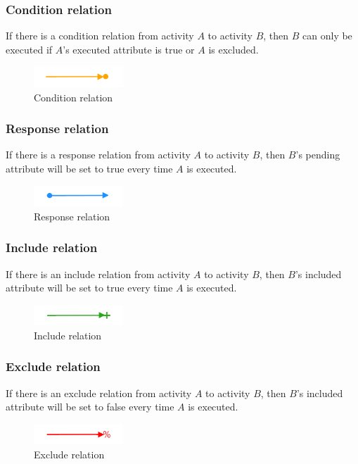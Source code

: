 \documentclass{article}
\begin{document}
			\subsubsection{Condition relation}
			If there is a condition relation from activity $A$ to activity $B$, then $B$ can only be executed if $A$'s executed attribute is true or $A$ is excluded.
			\begin{figure}[!ht]
				\centering
				\includegraphics[width=0.3\textwidth]{figures/ConditionRelation.png}
			 	\caption[Condition relation]
			 	{Condition relation}
			\end{figure}

			\subsubsection{Response relation}
			If there is a response relation from activity $A$ to activity $B$, then $B$'s pending attribute will be set to true every time $A$ is executed.
			\begin{figure}[!ht]
				\centering
				\includegraphics[width=0.3\textwidth]{figures/ResponseRelation.png}
			 	\caption[Response relation]
			 	{Response relation}
			\end{figure}

			\subsubsection{Include relation}
			If there is an include relation from activity $A$ to activity $B$, then $B$'s included attribute will be set to true every time $A$ is executed.
			\begin{figure}[!ht]
				\centering
				\includegraphics[width=0.3\textwidth]{figures/IncludeRelation.png}
			 	\caption[Include relation]
			 	{Include relation}
			\end{figure}

			\subsubsection{Exclude relation}
			If there is an exclude relation from activity $A$ to activity $B$, then $B$'s included attribute will be set to false every time $A$ is executed.
			\begin{figure}[!ht]
				\centering
				\includegraphics[width=0.3\textwidth]{figures/ExcludeRelation.png}
			 	\caption[Exclude relation]
			 	{Exclude relation}
			\end{figure}
\end{document}
